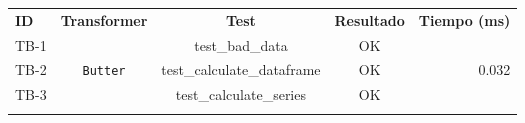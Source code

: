\begin{table}\small
	\centering
	\begin{center}
		\begin{tabular}{|l|c|cc|r|}
			\toprule
			\textbf{ID} & \textbf{Transformer} & \textbf{Test} & \textbf{Resultado} & \textbf{Tiempo (ms)}\\
			\otoprule
			TB-1 &  				& test\_bad\_data & OK & \\\cline{3-4}\cline{0-0}
			TB-2 & \texttt{Butter}	& test\_calculate\_dataframe & OK & 0.032\\\cline{3-4}\cline{0-0}
			TB-3 & 					& test\_calculate\_series & OK & \\\hubu
		\end{tabular}
	\end{center}
\end{table}

